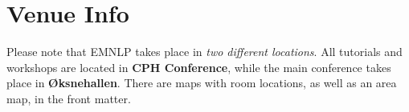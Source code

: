 \setheaders{}{}
\section{Venue Info}{}

Please note that EMNLP takes place in \textit{two different locations}. All tutorials and workshops are located in \textbf{CPH Conference}, while the main conference takes place in \textbf{Øksnehallen}. There are maps with room locations, as well as an area map, in the front matter.